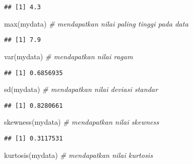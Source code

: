 \documentclass[
]{book}
\newenvironment{Shaded}{\begin{snugshade}}{\end{snugshade}}
\newcommand{\CommentTok}[1]{\textcolor[rgb]{0.56,0.35,0.01}{\textit{#1}}}
\newcommand{\FunctionTok}[1]{\textcolor[rgb]{0.00,0.00,0.00}{#1}}
\newcommand{\NormalTok}[1]{#1}
\begin{document}
\begin{verbatim}
## [1] 4.3
\end{verbatim}

\begin{Shaded}
\begin{Highlighting}[]
\FunctionTok{max}\NormalTok{(mydata)      }\CommentTok{\# mendapatkan nilai paling tinggi pada data}
\end{Highlighting}
\end{Shaded}

\begin{verbatim}
## [1] 7.9
\end{verbatim}

\begin{Shaded}
\begin{Highlighting}[]
\FunctionTok{var}\NormalTok{(mydata)      }\CommentTok{\# mendapatkan nilai ragam}
\end{Highlighting}
\end{Shaded}

\begin{verbatim}
## [1] 0.6856935
\end{verbatim}

\begin{Shaded}
\begin{Highlighting}[]
\FunctionTok{sd}\NormalTok{(mydata)       }\CommentTok{\# mendapatkan nilai deviasi standar}
\end{Highlighting}
\end{Shaded}

\begin{verbatim}
## [1] 0.8280661
\end{verbatim}

\begin{Shaded}
\begin{Highlighting}[]
\FunctionTok{skewness}\NormalTok{(mydata) }\CommentTok{\# mendapatkan nilai skewness}
\end{Highlighting}
\end{Shaded}

\begin{verbatim}
## [1] 0.3117531
\end{verbatim}

\begin{Shaded}
\begin{Highlighting}[]
\FunctionTok{kurtosis}\NormalTok{(mydata) }\CommentTok{\# mendapatkan nilai kurtosis}
\end{Highlighting}
\end{Shaded}
\end{document}
